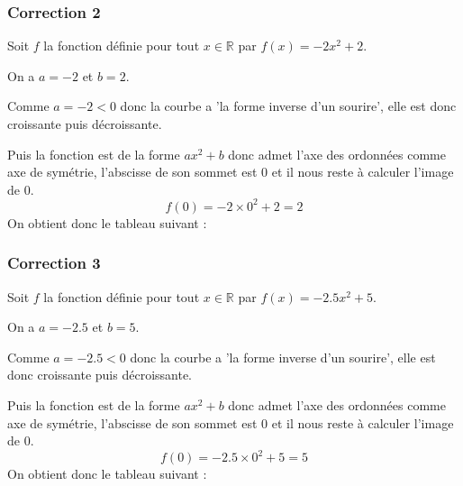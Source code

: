 \documentclass[15pt, mathserif]{beamer}
\newcommand{\R}{\mathbb{R}}			%
\begin{document}
\begin{frame}
\vspace{-10mm}
	\frametitle{Correction 2}
\vspace*{1cm} 
 Soit $f$ la fonction définie pour tout $x \in \R$ par $f(x)=-2x^2 +2$. 
 
 On a $a= -2$ et $b= 2$. 
 
 Comme $a=-2<0$ donc la courbe a 'la forme inverse d'un sourire', elle est donc croissante puis décroissante. 
 
 Puis la fonction est de la forme $ax^2+b$ donc admet l'axe des ordonnées comme axe de symétrie, l'abscisse de son sommet est 0 et il nous reste à calculer l'image de 0. $$f(0)= -2\times 0^2+2=2$$ On obtient donc le tableau suivant : 
 \begin{center} 
 \end{center} 
\end{frame}


\begin{frame}
\vspace{-10mm}
	\frametitle{Correction 3}
\vspace*{1cm} 
 Soit $f$ la fonction définie pour tout $x \in \R$ par $f(x)=-2.5x^2 +5$. 
 
 On a $a= -2.5$ et $b= 5$. 
 
 Comme $a=-2.5<0$ donc la courbe a 'la forme inverse d'un sourire', elle est donc croissante puis décroissante. 
 
 Puis la fonction est de la forme $ax^2+b$ donc admet l'axe des ordonnées comme axe de symétrie, l'abscisse de son sommet est 0 et il nous reste à calculer l'image de 0. $$f(0)= -2.5\times 0^2+5=5$$ On obtient donc le tableau suivant : 
 \begin{center} 
 \end{center} 
\end{frame}
\end{document}
